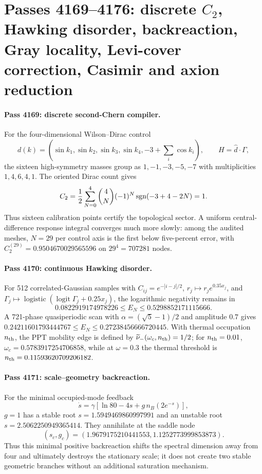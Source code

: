 \section{Passes 4169--4176: discrete $C_2$, Hawking disorder, backreaction, Gray locality, Levi-cover correction, Casimir and axion reduction}
\label{sec:bt4169-bt4176}

\paragraph{Pass 4169: discrete second-Chern compiler.}
For the four-dimensional Wilson--Dirac control
\[
d(k)=(\sin k_1,\sin k_2,\sin k_3,\sin k_4,-3+\textstyle\sum_i\cos k_i),
\qquad H=\widehat d\cdot\Gamma,
\]
the sixteen high-symmetry masses group as $1,-1,-3,-5,-7$ with multiplicities $1,4,6,4,1$.  The oriented Dirac count gives
\[
C_2={1\over2}\sum_{N=0}^4 {4\choose N}(-1)^N\operatorname{sgn}(-3+4-2N)=1.
\]
Thus sixteen calibration points certify the topological sector.  A uniform central-difference response integral converges much more slowly: among the audited meshes, $N=29$ per control axis is the first below five-percent error, with $C_2^{(29)}=0.9504670029565596$ on $29^4=707281$ nodes.

\paragraph{Pass 4170: continuous Hawking disorder.}
For 512 correlated-Gaussian samples with $C_{ij}=e^{-|i-j|/2}$, $r_j\mapsto r_j e^{0.35x_j}$, and $\Gamma_j\mapsto\operatorname{logistic}(\operatorname{logit}\Gamma_j+0.25x_j)$, the logarithmic negativity remains in
\[
0.0822919174978226\le E_N\le0.5298852171115666.
\]
A 721-phase quasiperiodic scan with $\alpha=(\sqrt5-1)/2$ and amplitude $0.7$ gives $0.24211601793444767\le E_N\le0.27238456666720445$.  With thermal occupation $n_{\rm th}$, the PPT mobility edge is defined by $\widetilde\nu_-(\omega_c,n_{\rm th})=1/2$; for $n_{\rm th}=0.01$, $\omega_c=0.5783917254706858$, while at $\omega=0.3$ the thermal threshold is $n_{\rm th}=0.11593620709206182$.

\paragraph{Pass 4171: scale--geometry backreaction.}
For the minimal occupied-mode feedback
\[
\dot s=\gamma\left[\ln80-4s+g\,n_B(2e^{-s})\right],
\]
$g=1$ has a stable root $s=1.5949469860997991$ and an unstable root $s=2.5062250949365414$.  They annihilate at the saddle node
\[
(s_c,g_c)=(1.9679175210441553,1.1252773999853873).
\]
Thus this minimal positive backreaction shifts the spectral dimension away from four and ultimately destroys the stationary scale; it does not create two stable geometric branches without an additional saturation mechanism.

